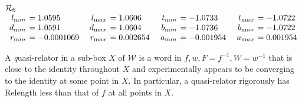 \begin{table}
\begin{small}
$$\begin{array}{rlrlrlrl}
\noalign{\noindent  ${\mathcal R}_6$}
\noalign{\vskip2pt}
l_{\textrm min} &\hskip-6pt =  1.0595&\enspace    l_{\textrm max} &\hskip-6pt =  1.0606&\enspace   
t_{\textrm min} &\hskip-6pt =  -1.0733&\enspace    t_{\textrm max} &\hskip-6pt =  -1.0722\\
d_{\textrm min} &\hskip-6pt =  1.0591&  d_{\textrm max}
&\hskip-6pt =  1.0604&   b_{\textrm min} &\hskip-6pt =  -1.0736&  b_{\textrm max} &\hskip-6pt =  -1.0722\\
r_{\textrm min} &\hskip-6pt =  -0.0001069& 
r_{\textrm max} &\hskip-6pt =  0.002654&   a_{\textrm min} &\hskip-6pt =  -0.001954&  a_{\textrm max} &\hskip-6pt =  0.001954\end{array}$$
\end{small}
\end{table}

\begin{definition} A {\textit quasi-relator} in a sub-box $X$ of ${\mathcal W}$ is a word in $f,w,F=f^{-1},W=w^{-1}$ that is close to the identity
throughout
$X$ and experimentally appears to be converging to the identity at some point in $X.$  In particular, a quasi-relator rigorously has Relength less than
that of $f$ at all points in $X.$
\end{definition}

